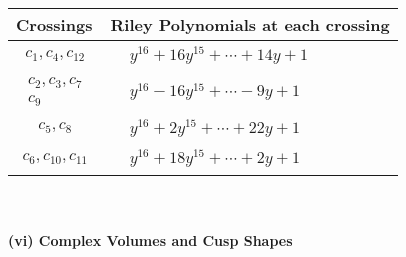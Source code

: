 \documentclass[1p]{elsarticle_modified}
\theoremstyle{definition}
\begin{document}
\begin{tabular}{m{50pt}|m{274pt}}
Crossings & \hspace{64pt}Riley Polynomials at each crossing \\
\hline $$\begin{aligned}c_{1},c_{4},c_{12}\end{aligned}$$&$\begin{aligned}
&y^{16}+16 y^{15}+\cdots+14 y+1
\end{aligned}$\\
\hline $$\begin{aligned}c_{2},c_{3},c_{7}\\c_{9}\end{aligned}$$&$\begin{aligned}
&y^{16}-16 y^{15}+\cdots-9 y+1
\end{aligned}$\\
\hline $$\begin{aligned}c_{5},c_{8}\end{aligned}$$&$\begin{aligned}
&y^{16}+2 y^{15}+\cdots+22 y+1
\end{aligned}$\\
\hline $$\begin{aligned}c_{6},c_{10},c_{11}\end{aligned}$$&$\begin{aligned}
&y^{16}+18 y^{15}+\cdots+2 y+1
\end{aligned}$\\
\hline
\end{tabular}\\~\\
\newpage\flushleft \textbf{(vi) Complex Volumes and Cusp Shapes}
\end{document}
